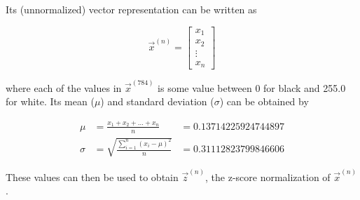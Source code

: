 Its (unnormalized) vector representation can be written as

\begin{equation*}
	\vec{x}^{(n)}  =
	\begin{bmatrix}
		x_1    \\
		x_2    \\
		\vdots \\
		x_n
	\end{bmatrix}
\end{equation*}

where each of the values in $\vec{x}^{(784)}$ is some value between 0 for black
and 255.0 for white. Its mean ($\mu$) and standard deviation ($\sigma$) can be
obtained by

\begin{equation*}
	\begin{aligned}
		\mu    & = \frac{x_1 + x_2 + \ldots + x_n}{n}            & = 0.13714225924744897 \\
		\sigma & = \sqrt{\frac{\sum_{i=1}^{n} (x_i - \mu)^2}{n}} & = 0.31112823799846606
	\end{aligned}
\end{equation*}

These values can then be used to obtain $\vec{z}^{(n)}$, the z-score
normalization of $\vec{x}^{(n)}$.
